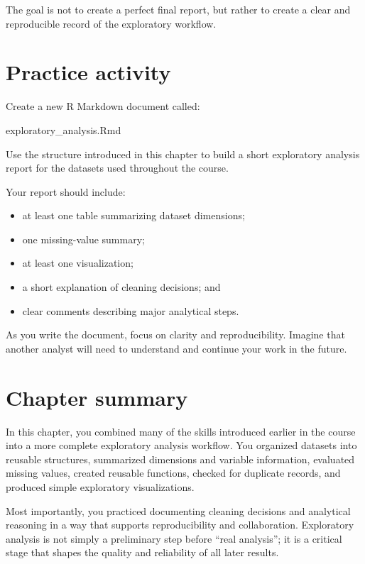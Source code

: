 \documentclass[
  11pt,
  oneside]{book}
\newenvironment{Shaded}{\begin{snugshade}}{\end{snugshade}}
\newcommand{\NormalTok}[1]{#1}
\providecommand{\tightlist}{%
  \setlength{\itemsep}{0pt}\setlength{\parskip}{0pt}}
\begin{document}
The goal is not to create a perfect final report, but rather to create a clear and reproducible record of the exploratory workflow.

\section{Practice activity}\label{practice-activity}

Create a new R Markdown document called:

\begin{Shaded}
\begin{Highlighting}[]
\NormalTok{exploratory\_analysis.Rmd}
\end{Highlighting}
\end{Shaded}

Use the structure introduced in this chapter to build a short exploratory analysis report for the datasets used throughout the course.

Your report should include:

\begin{itemize}
\tightlist
\item
  at least one table summarizing dataset dimensions;
\item
  one missing-value summary;
\item
  at least one visualization;
\item
  a short explanation of cleaning decisions; and
\item
  clear comments describing major analytical steps.
\end{itemize}

As you write the document, focus on clarity and reproducibility. Imagine that another analyst will need to understand and continue your work in the future.

\section{Chapter summary}\label{chapter-summary-6}

In this chapter, you combined many of the skills introduced earlier in the course into a more complete exploratory analysis workflow. You organized datasets into reusable structures, summarized dimensions and variable information, evaluated missing values, created reusable functions, checked for duplicate records, and produced simple exploratory visualizations.

Most importantly, you practiced documenting cleaning decisions and analytical reasoning in a way that supports reproducibility and collaboration. Exploratory analysis is not simply a preliminary step before ``real analysis''; it is a critical stage that shapes the quality and reliability of all later results.
\end{document}

